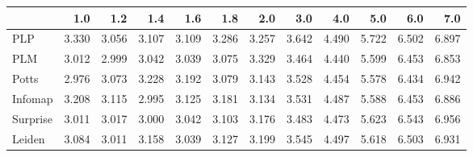 \begin{tabular}{lrrrrrrrrrrr}
\toprule
{} &   1.0 &   1.2 &   1.4 &   1.6 &   1.8 &   2.0 &   3.0 &   4.0 &   5.0 &   6.0 &   7.0 \\
\midrule
PLP      & 3.330 & 3.056 & 3.107 & 3.109 & 3.286 & 3.257 & 3.642 & 4.490 & 5.722 & 6.502 & 6.897 \\
PLM      & 3.012 & 2.999 & 3.042 & 3.039 & 3.075 & 3.329 & 3.464 & 4.440 & 5.599 & 6.453 & 6.853 \\
Potts    & 2.976 & 3.073 & 3.228 & 3.192 & 3.079 & 3.143 & 3.528 & 4.454 & 5.578 & 6.434 & 6.942 \\
Infomap  & 3.208 & 3.115 & 2.995 & 3.125 & 3.181 & 3.134 & 3.531 & 4.487 & 5.588 & 6.453 & 6.886 \\
Surprise & 3.011 & 3.017 & 3.000 & 3.042 & 3.103 & 3.176 & 3.483 & 4.473 & 5.623 & 6.543 & 6.956 \\
Leiden   & 3.084 & 3.011 & 3.158 & 3.039 & 3.127 & 3.199 & 3.545 & 4.497 & 5.618 & 6.503 & 6.931 \\
\bottomrule
\end{tabular}
